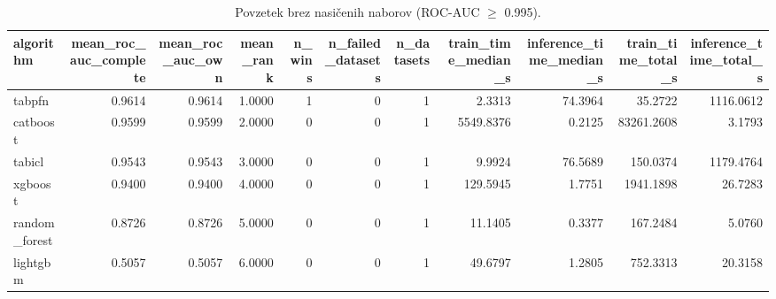\begin{table}[htbp]
\centering
\caption{Povzetek brez nasičenih naborov (ROC-AUC $\geq$ 0.995).}
\label{tab:overall-nonsat}
\begin{tabular}{lrrrrrrrrrr}
\hline
algorithm & mean\_roc\_auc\_complete & mean\_roc\_auc\_own & mean\_rank & n\_wins & n\_failed\_datasets & n\_datasets & train\_time\_median\_s & inference\_time\_median\_s & train\_time\_total\_s & inference\_time\_total\_s \\
\hline
tabpfn & 0.9614 & 0.9614 & 1.0000 & 1 & 0 & 1 & 2.3313 & 74.3964 & 35.2722 & 1116.0612 \\
catboost & 0.9599 & 0.9599 & 2.0000 & 0 & 0 & 1 & 5549.8376 & 0.2125 & 83261.2608 & 3.1793 \\
tabicl & 0.9543 & 0.9543 & 3.0000 & 0 & 0 & 1 & 9.9924 & 76.5689 & 150.0374 & 1179.4764 \\
xgboost & 0.9400 & 0.9400 & 4.0000 & 0 & 0 & 1 & 129.5945 & 1.7751 & 1941.1898 & 26.7283 \\
random\_forest & 0.8726 & 0.8726 & 5.0000 & 0 & 0 & 1 & 11.1405 & 0.3377 & 167.2484 & 5.0760 \\
lightgbm & 0.5057 & 0.5057 & 6.0000 & 0 & 0 & 1 & 49.6797 & 1.2805 & 752.3313 & 20.3158 \\
\hline
\end{tabular}
\end{table}
